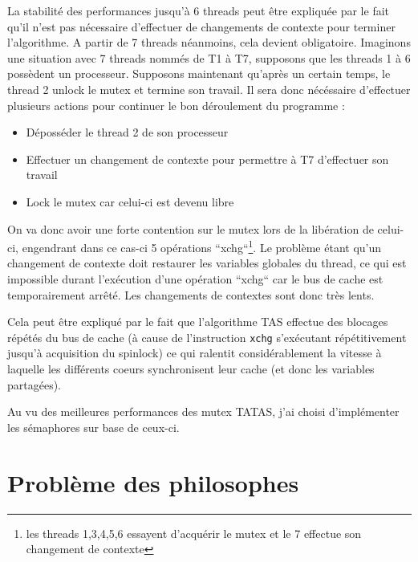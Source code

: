 \noindent La stabilité des performances jusqu'à 6 threads peut être expliquée par le fait qu'il n'est pas nécessaire d'effectuer de changements de contexte pour terminer l'algorithme.
A partir de 7 threads néanmoins, cela devient obligatoire. Imaginons une situation avec 7 threads nommés de T1 à T7, supposons que les threads 1 à 6 possèdent un processeur. 
Supposons maintenant qu'après un certain temps, le thread 2 unlock le mutex et termine son travail. Il sera donc nécéssaire d'effectuer plusieurs actions pour continuer le bon déroulement du programme :
\begin{itemize}
    \item Déposséder le thread 2 de son processeur
    \item Effectuer un changement de contexte pour permettre à T7 d'effectuer son travail
    \item Lock le mutex car celui-ci est devenu libre
\end{itemize}
On va donc avoir une forte contention sur le mutex lors de la libération de celui-ci, engendrant dans ce cas-ci 5 opérations ``xchg``\footnote{les threads 1,3,4,5,6 essayent d'acquérir le mutex et le 7 effectue son changement de contexte}.
Le problème étant qu'un changement de contexte doit restaurer les variables globales du thread, ce qui est impossible durant l'exécution d'une opération ``xchg`` car le bus de cache est temporairement arrêté. Les changements de contextes sont donc très lents.

\noindent Cela peut être expliqué par le fait que l'algorithme TAS effectue des blocages répétés du bus de cache (à cause de l'instruction \texttt{xchg} s'exécutant répétitivement jusqu'à acquisition du spinlock) ce qui ralentit considérablement la vitesse à laquelle les différents coeurs synchronisent leur cache (et donc les variables partagées).

\noindent Au vu des meilleures performances des mutex TATAS, j'ai choisi d'implémenter les sémaphores sur base de ceux-ci.
\section{Problème des philosophes}

